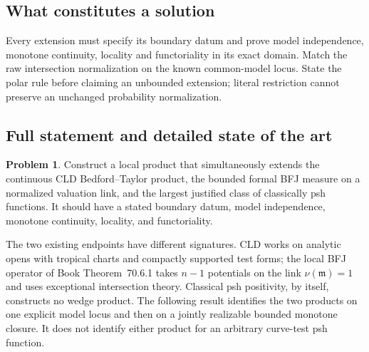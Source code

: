 \documentclass[11pt,a4paper]{article}
\theoremstyle{definition}
\newtheorem{problem}{Problem}[section]
\theoremstyle{remark}
\begin{document}
\subsection{What constitutes a solution}
Every extension must specify its boundary datum and prove model independence, monotone continuity, locality and functoriality in its exact domain. Match the raw intersection normalization on the known common-model locus. State the polar rule before claiming an unbounded extension; literal restriction cannot preserve an unchanged probability normalization.

\subsection{Full statement and detailed state of the art}
\label{sec:ch72-local-ma}

\begin{problem}\label{prob:frontier-local-ma}
Construct a local product that simultaneously extends the continuous CLD
Bedford--Taylor product, the bounded formal BFJ measure on a normalized
valuation link, and the largest justified class of classically psh functions.
It should have a stated boundary datum, model independence, monotone
continuity, locality, and functoriality.
\end{problem}

The two existing endpoints have different signatures.  CLD works on analytic
opens with tropical charts and compactly supported test forms; the local BFJ
operator of Book Theorem~70.6.1 takes \(n-1\) potentials on the link
\(\nu(\mathfrak m)=1\) and uses exceptional intersection theory.  Classical
psh positivity, by itself, constructs no wedge product.  The following
result identifies the two products on one explicit model locus and then on a
jointly realizable bounded monotone closure.  It does not identify either
product for an arbitrary curve-test psh function.
\end{document}
